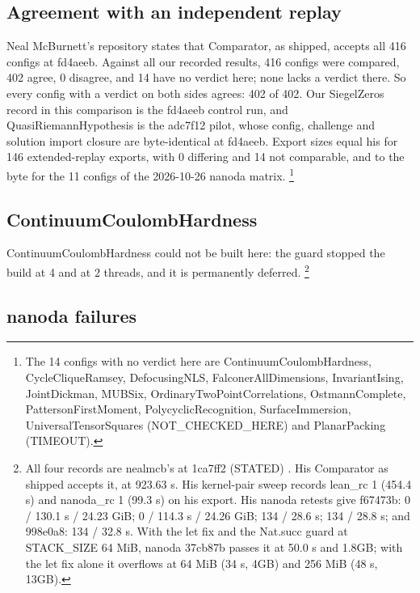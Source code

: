 \subsection{Agreement with an independent replay}

Neal McBurnett's repository \cite{mcburnett-tooling} states that Comparator, as shipped, accepts all 416 configs at fd4aeeb. %
Against all our recorded results, 416 configs were compared, 402 agree, 0 disagree, and 14 have no verdict here; none lacks a verdict there. %
So every config with a verdict on both sides agrees: 402 of 402. %
Our SiegelZeros record in this comparison is the fd4aeeb control run, and QuasiRiemannHypothesis is the adc7f12 pilot, whose config, challenge and solution import closure are byte-identical at fd4aeeb. %
Export sizes equal his for 146 extended-replay exports, with 0 differing and 14 not comparable, and to the byte for the 11 configs of the 2026-10-26 nanoda matrix. %
\footnote{The 14 configs with no verdict here are ContinuumCoulombHardness, CycleCliqueRamsey, DefocusingNLS, FalconerAllDimensions, InvariantIsing, JointDickman, MUBSix, OrdinaryTwoPointCorrelations, OstmannComplete, PattersonFirstMoment, PolycyclicRecognition, SurfaceImmersion, UniversalTensorSquares (NOT\_CHECKED\_HERE) and PlanarPacking (TIMEOUT). %
}

\subsection{ContinuumCoulombHardness}

ContinuumCoulombHardness could not be built here: the guard stopped the build at 4 and at 2 threads, and it is permanently deferred. %
\footnote{All four records are nealmcb's at 1ca7ff2 (STATED) \cite{mcburnett-tooling}. His Comparator as shipped accepts it, at 923.63 s. %
His kernel-pair sweep records lean\_rc 1 (454.4 s) and nanoda\_rc 1 (99.3 s) on his export. %
His nanoda retests give f67473b: 0 / 130.1 s / 24.23 GiB; 0 / 114.3 s / 24.26 GiB; 134 / 28.6 s; 134 / 28.8 s; and 998e0a8: 134 / 32.8 s. %
With the let fix and the Nat.succ guard at STACK\_SIZE 64 MiB, nanoda 37cb87b passes it at 50.0 s and 1.8GB; with the let fix alone it overflows at 64 MiB (34 s, 4GB) and 256 MiB (48 s, 13GB). %
}

\subsection{nanoda failures}


